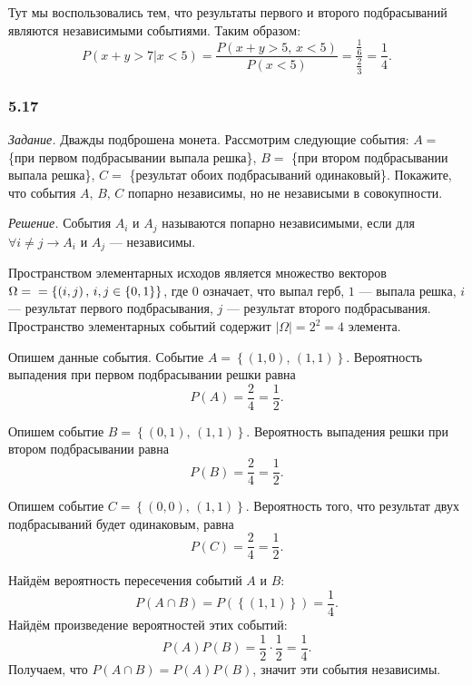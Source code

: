 Тут мы воспользовались тем, что результаты первого и второго подбрасываний являются независимыми событиями.
Таким образом:
$$P \left( \left. x+y>7 \right| x<5 \right) =
\frac{P \left( x+y>5, \, x<5 \right) }{P \left( x<5 \right) } =
\frac{ \frac{1}{6} }{ \frac{2}{3} } =
\frac{1}{4}.$$

\subsubsection*{5.17}

\textit{Задание.} Дважды подброшена монета.
Рассмотрим следующие события:
$A =$ \{при первом подбрасывании выпала решка\}, $B =$ \{при втором подбрасывании выпала решка\}, $C =$ \{результат обоих подбрасываний одинаковый\}.
Покажите, что события $A, \, B, \, C$ попарно независимы, но не независыми в совокупности.

\textit{Решение.} События $A_i$ и $A_j$ называются попарно независимыми, если для $ \forall i \neq j \rightarrow A_i $ и $A_j$ --- независимы.

Пространством элементарных исходов является множество векторов
$ \Omega = \\
= \left\{ \left( i, j \right), \, i, j \in \left\{ 0, 1 \right\} \right\}$,
где $0$ означает, что выпал герб, $1$ --- выпала решка, $i$ --- результат первого подбрасывания, $j$ --- результат второго подбрасывания.
Пространство элементарных событий содержит $ \left| \Omega \right| = 2^2 = 4$ элемента.

Опишем данные события.
Событие $A = \left\{ \left( 1, 0 \right), \, \left( 1, 1 \right) \right\} $.
Вероятность выпадения при первом подбрасывании решки равна
$$P \left( A \right) =
\frac{2}{4} =
\frac{1}{2}.$$

Опишем событие $B = \left\{ \left( 0, 1 \right), \, \left( 1, 1 \right) \right\} $.
Вероятность выпадения решки при втором подбрасывании равна
$$P \left( B \right) =
\frac{2}{4} =
\frac{1}{2}.$$

Опишем событие $C = \left\{ \left( 0, 0 \right), \, \left( 1, 1 \right) \right\} $.
Вероятность того, что результат двух подбрасываний будет одинаковым, равна
$$P \left( C \right) =
\frac{2}{4} =
\frac{1}{2}.$$

Найдём вероятность пересечения событий $A$ и $B$:
$$P \left( A \cap B \right) =
P \left( \left\{ \left( 1, 1 \right) \right\} \right) =
\frac{1}{4}.$$
Найдём произведение вероятностей этих событий:
$$P \left( A \right) P \left( B \right) =
\frac{1}{2} \cdot \frac{1}{2} =
\frac{1}{4}.$$
Получаем, что $P \left( A \cap B \right) = P \left( A \right) P \left( B \right) $, значит эти события независимы.

